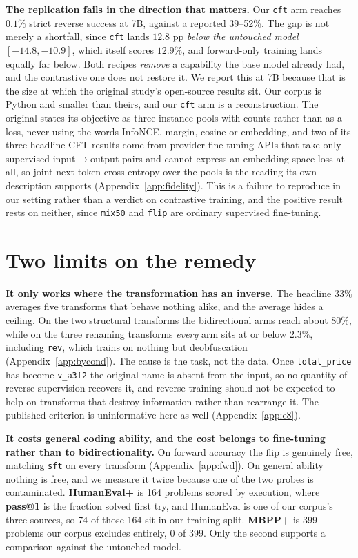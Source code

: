 \documentclass{article}
\newcommand{\arm}[1]{\texttt{#1}}
\begin{document}
\textbf{The replication fails in the direction that matters.} Our \arm{cft} arm reaches
$0.1\%$ strict reverse success at 7B, against a reported 39--52\%. The gap is not merely a shortfall, since \arm{cft}
lands $12.8$ pp \emph{below the untouched model} $[-14.8,-10.9]$, which itself scores $12.9\%$,
and forward-only training lands equally far below. Both recipes \emph{remove} a capability the
base model already had, and the contrastive one does not restore it. We report this at 7B
because that is the size at which the original study's open-source results sit. Our corpus is
Python and smaller than theirs, and our \arm{cft} arm is a reconstruction. The original states
its objective as three instance pools with counts rather than as a loss, never using the words
InfoNCE, margin, cosine or embedding, and two of its three headline CFT results come from
provider fine-tuning APIs that take only supervised input$\rightarrow$output pairs and cannot
express an embedding-space loss at all, so joint next-token cross-entropy over the pools is the
reading its own description supports (Appendix~\ref{app:fidelity}). This is a failure to
reproduce in our setting rather than a verdict on contrastive training, and the positive result
rests on neither, since \arm{mix50} and \arm{flip} are ordinary supervised fine-tuning.

\section{Two limits on the remedy}
\label{sec:cost}

\textbf{It only works where the transformation has an inverse.} The headline $33\%$ averages
five transforms that behave nothing alike, and the average hides a ceiling. On the two
structural transforms the bidirectional arms reach about $80\%$, while on the three renaming
transforms \emph{every} arm sits at or below $2.3\%$, including \arm{rev}, which trains on
nothing but deobfuscation (Appendix~\ref{app:bycond}). The cause is the task, not the data.
Once \texttt{total\_price} has become \texttt{v\_a3f2} the original name is absent from the
input, so no quantity of reverse supervision recovers it, and reverse training should not be
expected to help on transforms that destroy information rather than rearrange it. The published criterion is
uninformative here as well (Appendix~\ref{app:e8}).

\textbf{It costs general coding ability, and the cost belongs to fine-tuning rather than to
bidirectionality.} On forward accuracy the flip is genuinely free, matching \arm{sft} on every
transform (Appendix~\ref{app:fwd}). On general ability nothing is free, and we measure it twice
because one of the two probes is contaminated. \textbf{HumanEval+} \citep{liu2023evalplus} is 164
problems scored by execution, where \textbf{pass@1} is the fraction solved first try, and
HumanEval is one of our corpus's three sources, so 74 of those 164 sit in our training split.
\textbf{MBPP+} is 399 problems our corpus excludes entirely, 0 of 399. Only the second supports a
comparison against the untouched model.
\end{document}

